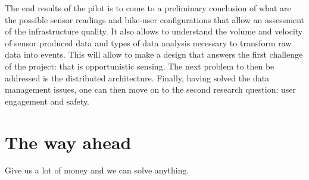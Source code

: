 \documentclass[preprint,12pt]{elsarticle}
\theoremstyle{definition}
\begin{document}
The end results of the pilot is to come to a preliminary conclusion of
what are the possible sensor readings and bike-user configurations
that allow an assessment of the infrastructure quality. It also allows
to understand the volume and velocity of sensor produced data and
types of data analysis necessary to transform raw data into
events. This will allow to make a design that answers the first
challenge of the project: that is opportunistic sensing. The next
problem to then be addressed is the distributed architecture. Finally,
having solved the data management issues, one can then move on to the
second research question: user engagement and safety.






\section{The way ahead}

Give us a lot of money and we can solve anything.





\end{document}
